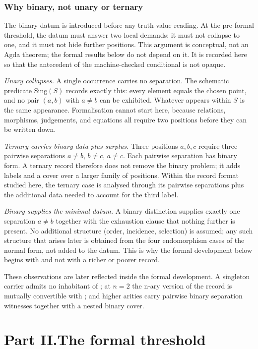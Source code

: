 \documentclass[11pt]{article}
\begin{document}
\section*{Why binary, not unary or ternary}

The binary datum is introduced before any truth-value reading.  At the
pre-formal threshold, the datum must answer two local demands: it must
not collapse to one, and it must not hide further positions.  This
argument is conceptual, not an Agda theorem; the formal results below
do not depend on it.  It is recorded here so that the antecedent of the
machine-checked conditional is not opaque.

\emph{Unary collapses.}  A single occurrence carries no separation.
The schematic predicate $\mathrm{Sing}(S)$ records exactly this: every
element equals the chosen point, and no pair $(a,b)$ with $a\neq b$
can be exhibited.  Whatever appears within $S$ is the same appearance.
Formalisation cannot start here, because relations, morphisms,
judgements, and equations all require two positions before they can be
written down.

\emph{Ternary carries binary data plus surplus.}  Three positions
$a,b,c$ require three pairwise separations $a\neq b$, $b\neq c$,
$a\neq c$.  Each pairwise separation has binary form.  A ternary record
therefore does not remove the binary problem; it adds labels and a cover
over a larger family of positions.  Within the record format studied
here, the ternary case is analysed through its pairwise separations plus
the additional data needed to account for the third label.

\emph{Binary supplies the minimal datum.}  A binary distinction supplies exactly one
separation $a\neq b$ together with the exhaustion clause that nothing
further is present.  No additional structure (order, incidence,
selection) is assumed; any such structure that arises later is obtained
from the four endomorphism cases of the normal form, not added to the
datum.  This is why the formal development below begins with
 and not with a richer or poorer record.

These observations are later reflected inside the formal development.
A singleton carrier admits no inhabitant of ;
at $n=2$ the n-ary version of the record is mutually convertible with
; and higher arities carry pairwise binary
separation witnesses together with a nested binary cover.

\part*{Part II.\quad The formal threshold}
\end{document}
